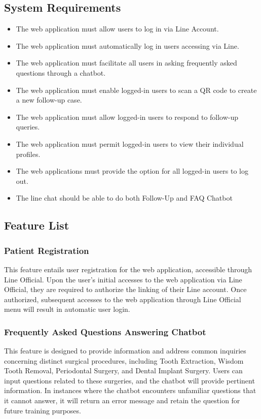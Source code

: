 \documentclass[12pt,oneside,openright,a4paper]{cpe-english-project}
\begin{document}
    \subsection{System Requirements}
    \begin{itemize}
      \item The web application must allow users to log in via Line Account.
      \item The web application must automatically log in users accessing via Line.
      \item The web application must facilitate all users in asking frequently asked questions through a chatbot.
      \item The web application must enable logged-in users to scan a QR code to create a new follow-up case.
      \item The web application must allow logged-in users to respond to follow-up queries.
      \item The web application must permit logged-in users to view their individual profiles.
      \item The web applications must provide the option for all logged-in users to log out.
      \item The line chat should be able to do both Follow-Up and FAQ Chatbot
    \end{itemize}

    \subsection{Feature List}
      \subsubsection{Patient Registration}
      \qquad This feature entails user registration for the web application, accessible through Line Official. Upon the user’s initial accesses to the web application via Line Official, they are required to authorize the linking of their Line account. Once authorized, subsequent accesses to the web application through Line Official menu will result in automatic user login. \par
      \subsubsection{Frequently Asked Questions Answering Chatbot}
      \qquad This feature is designed to provide information and address common inquiries concerning distinct surgical procedures, including Tooth Extraction, Wisdom Tooth Removal, Periodontal Surgery, and Dental Implant Surgery. Users can input questions related to these surgeries, and the chatbot will provide pertinent information. In instances where the chatbot encounters unfamiliar questions that it cannot answer, it will return an error message and retain the question for future training purposes. \par
\end{document}
